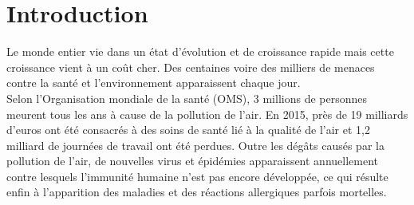 \chapter*{Introduction}

\qquad Le monde entier vie dans un état d'évolution et de croissance rapide mais cette croissance vient à un coût cher. Des centaines voire des milliers de menaces contre la santé et l'environnement apparaissent chaque jour.\\

Selon l’Organisation mondiale de la santé (OMS), 3 millions de personnes meurent tous les ans à cause de la pollution de l’air. En 2015, près de 19 milliards d’euros ont été consacrés à des soins de santé lié à la qualité de l’air et 1,2 milliard de journées de travail ont été perdues. Outre les dégâts causés par la pollution de l'air, de nouvelles virus et épidémies apparaissent annuellement contre lesquels l'immunité humaine n'est pas encore développée, ce qui résulte enfin à l'apparition des maladies et des réactions allergiques parfois mortelles.   

